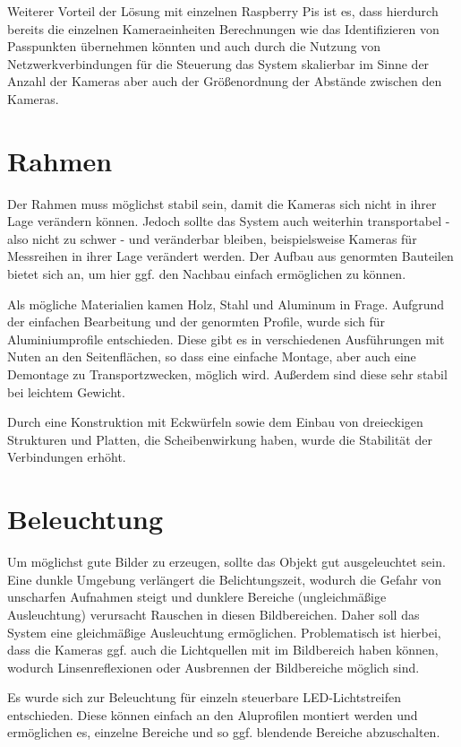 \documentclass[./00_PhotoBox.tex]{subfiles}
\begin{document}
Weiterer Vorteil der Lösung mit einzelnen Raspberry Pis ist es, dass hierdurch bereits die einzelnen Kameraeinheiten Berechnungen wie das Identifizieren von Passpunkten übernehmen könnten und auch durch die Nutzung von Netzwerkverbindungen für die Steuerung das System skalierbar im Sinne der Anzahl der Kameras aber auch der Größenordnung der Abstände zwischen den Kameras.

\section{Rahmen}
Der Rahmen muss möglichst stabil sein, damit die Kameras sich nicht in ihrer Lage verändern können. Jedoch sollte das System auch weiterhin transportabel - also nicht zu schwer - und veränderbar bleiben, beispielsweise Kameras für Messreihen in ihrer Lage verändert werden. Der Aufbau aus genormten Bauteilen bietet sich an, um hier ggf. den Nachbau einfach ermöglichen zu können.

Als mögliche Materialien kamen Holz, Stahl und Aluminum in Frage. Aufgrund der einfachen Bearbeitung und der genormten Profile, wurde sich für Aluminiumprofile entschieden. Diese gibt es in verschiedenen Ausführungen mit Nuten an den Seitenflächen, so dass eine einfache Montage, aber auch eine Demontage zu Transportzwecken, möglich wird. Außerdem sind diese sehr stabil bei leichtem Gewicht.

Durch eine Konstruktion mit Eckwürfeln sowie dem Einbau von dreieckigen Strukturen und Platten, die Scheibenwirkung haben, wurde die Stabilität der Verbindungen erhöht.

\section{Beleuchtung}
Um möglichst gute Bilder zu erzeugen, sollte das Objekt gut ausgeleuchtet sein. Eine dunkle Umgebung verlängert die Belichtungszeit, wodurch die Gefahr von unscharfen Aufnahmen steigt und dunklere Bereiche (ungleichmäßige Ausleuchtung) verursacht Rauschen in diesen Bildbereichen. Daher soll das System eine gleichmäßige Ausleuchtung ermöglichen. Problematisch ist hierbei, dass die Kameras ggf. auch die Lichtquellen mit im Bildbereich haben können, wodurch Linsenreflexionen oder Ausbrennen der Bildbereiche möglich sind.

Es wurde sich zur Beleuchtung für einzeln steuerbare LED-Lichtstreifen entschieden. Diese können einfach an den Aluprofilen montiert werden und ermöglichen es, einzelne Bereiche und so ggf. blendende Bereiche abzuschalten.
\end{document}

